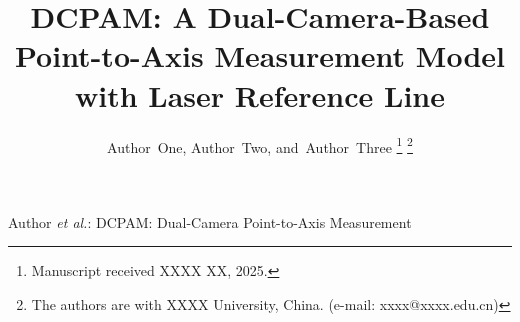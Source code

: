 \documentclass[lettersize,journal]{IEEEtran}
\begin{document}
\title{DCPAM: A Dual-Camera-Based Point-to-Axis Measurement Model
       with Laser Reference Line}

\author{
  Author~One,
  Author~Two,
  and~Author~Three
  \thanks{Manuscript received XXXX XX, 2025.}
  \thanks{The authors are with XXXX University, China.
          (e-mail: xxxx@xxxx.edu.cn)}
}

%
{Author \MakeLowercase{\textit{et al.}}:
 DCPAM: Dual-Camera Point-to-Axis Measurement}

\maketitle












\end{document}

